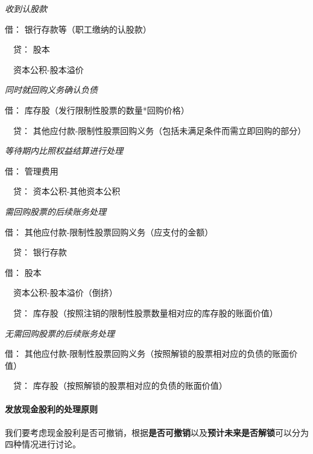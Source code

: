 \documentclass[UTF8,12pt]{ctexart}
\newenvironment{Dr}{\noindent 借：}{\par}
\newenvironment{Cr}{\noindent \ \ 贷：}{\par}
\numberwithin{equation}{section} %
\numberwithin{figure}{section}
\numberwithin{table}{section}
\begin{document}
	\textit{收到认股款}
	
	\begin{Dr}
		银行存款等（职工缴纳的认股款）
	\end{Dr}
	\begin{Cr}
		股本
		
		\ \ 资本公积-股本溢价
	\end{Cr}
	
	\textit{同时就回购义务确认负债}

	\begin{Dr}
		库存股（发行限制性股票的数量*回购价格）
	\end{Dr}
	\begin{Cr}
		其他应付款-限制性股票回购义务（包括未满足条件而需立即回购的部分）
	\end{Cr}

	\textit{等待期内比照权益结算进行处理}
	
	\begin{Dr}
		管理费用
	\end{Dr}	
	\begin{Cr}
		资本公积-其他资本公积
	\end{Cr}

	\textit{需回购股票的后续账务处理}

	\begin{Dr}
		其他应付款-限制性股票回购义务（应支付的金额）
	\end{Dr}
	\begin{Cr}
		银行存款
	\end{Cr}
	\begin{Dr}
		股本
		
		\ \ 资本公积-股本溢价（倒挤）
	\end{Dr}
	\begin{Cr}
		库存股（按照注销的限制性股票数量相对应的库存股的账面价值）
	\end{Cr}

	\textit{无需回购股票的后续账务处理}
	
	\begin{Dr}
		其他应付款-限制性股票回购义务（按照解锁的股票相对应的负债的账面价值）
	\end{Dr}
	\begin{Cr}
		库存股（按照解锁的股票相对应的负债的账面价值）
	\end{Cr}

	\paragraph{发放现金股利的处理原则}
	我们要考虑现金股利是否可撤销，根据\textbf{是否可撤销}以及\textbf{预计未来是否解锁}可以分为四种情况进行讨论。
	
\end{document}
